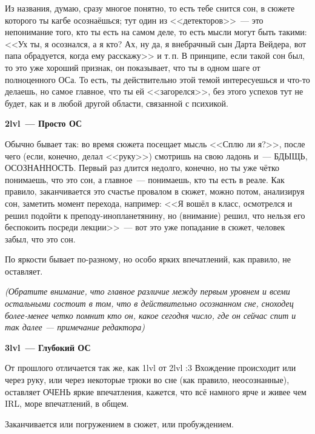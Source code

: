 \documentclass[a5paper,12pt,twoside]{memoir}
\begin{document}
Из названия, думаю, сразу многое понятно, то есть тебе снится сон, в сюжете которого ты кагбе осознаёшься; тут один из <<детекторов>>~--- это непонимание того, кто ты есть на самом деле, то есть мысли могут быть такими: <<Ух ты, я осознался, а я кто? Ах, ну да, я внебрачный сын Дарта Вейдера, вот папа обрадуется, когда ему расскажу>> и т.\,п.
В принципе, если такой сон был, то это уже хороший признак, он показывает, что ты в одном шаге от полноценного ОСа. То есть, ты действительно этой темой интересуешься и что-то делаешь, но самое главное, что ты ей <<загорелся>>, без этого успехов тут не будет, как и в любой другой области, связанной с психикой.

\bigskip

\clearpage

\begin{center}
\textbf{2lvl~--- Просто ОС}
\end{center}


Обычно бывает так: во время сюжета посещает мысль <<Сплю ли я?>>, после чего  (если, конечно, делал <<руку>>) смотришь на свою ладонь и~--- БДЫЩЬ, ОСОЗНАННОСТЬ. Первый раз длится недолго, конечно, но ты уже чётко понимаешь, что это сон, а главное~--- понимаешь, кто ты есть в реале. Как правило, заканчивается это счастье провалом в сюжет, можно потом, анализируя сон, заметить момент перехода, например: <<Я вошёл в класс, осмотрелся и решил подойти к преподу-инопланетянину, но (внимание) решил, что нельзя его беспокоить посреди лекции>>~--- вот это уже попадание в сюжет, человек забыл, что это сон.

По яркости бывает по-разному, но особо ярких впечатлений, как правило, не оставляет.

\textit{(Обратите внимание, что главное различие между первым уровнем и всеми остальными состоит в том, что в действительно осознанном сне, сноходец более-менее четко помнит кто он, какое сегодня число, где он сейчас спит и так далее --- примечание редактора)}


\begin{center}
\textbf{3lvl~--- Глубокий ОС}
\end{center}


От прошлого отличается так же, как 1lvl от 2lvl :3 Вхождение происходит или через руку, или через некоторые трюки во сне (как правило, неосознанные), оставляет ОЧЕНЬ яркие впечатления, кажется, что всё намного ярче и живее чем IRL, море впечатлений, в общем.

Заканчивается или погружением в сюжет, или пробуждением.
\end{document}
